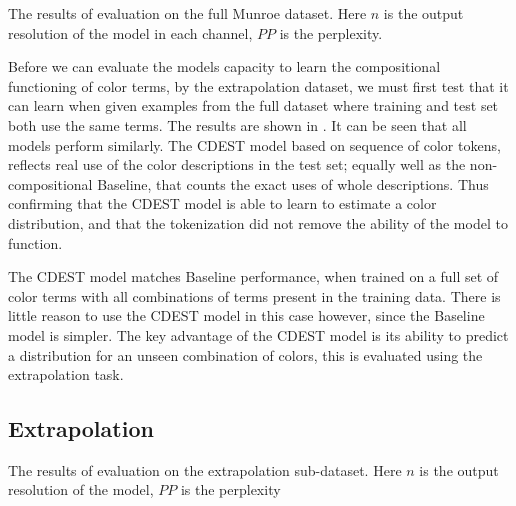 \documentclass[11pt,a4paper]{article}
\begin{document}
\begin{table}
	\centering
	\caption{\label{tblresfull} The results of evaluation on the full Munroe  dataset. Here $n$ is the output resolution of the model in each channel, $PP$ is the perplexity.}
\end{table}

Before we can evaluate the models capacity to learn the compositional functioning of color terms, by the extrapolation dataset, we must first test that it can learn when given examples from the full dataset where training and test set both use the same terms.
The results are shown in .
It can be seen that all models perform similarly.
The CDEST model based on sequence of color tokens, reflects real use of the color descriptions in the test set; 
equally well as the non-compositional Baseline, that counts the exact uses of whole descriptions.
Thus confirming that the CDEST model is able to learn to estimate a color distribution, and that the tokenization did not remove the ability of the model to function.

The CDEST model matches Baseline performance, when trained on a full set of color terms with all combinations of terms present in the training data.
There is little reason to use the CDEST model in this case however, since the Baseline model is simpler.
The key advantage of the CDEST model is its ability to predict a distribution for an unseen combination of colors, this is evaluated using the extrapolation task.

\subsection{Extrapolation}

\begin{table}
	\centering
	\caption{\label{tblresextrapo} The results of evaluation on the extrapolation sub-dataset. Here $n$ is the output resolution of the model, $PP$ is the perplexity}
\end{table}
\end{document}
